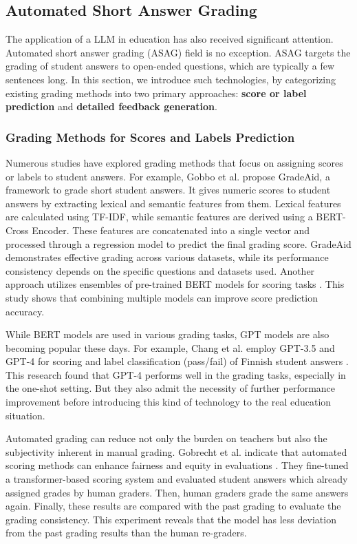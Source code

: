 \subsection{Automated Short Answer Grading}
The application of a LLM in education has also received significant attention.
Automated short answer grading (ASAG) field is no exception.
ASAG targets the grading of student answers to open-ended questions, which are typically a few sentences long.
In this section, we introduce such technologies, by categorizing existing grading methods into two primary approaches: \textbf{score or label prediction} and \textbf{detailed feedback generation}.


\subsubsection{Grading Methods for Scores and Labels Prediction}
Numerous studies have explored grading methods that focus on assigning scores or labels to student answers.
For example, Gobbo et al. propose GradeAid, a framework to grade short student answers.
It gives numeric scores to student answers by extracting lexical and semantic features \citep{gradeaid} from them.
Lexical features are calculated using TF-IDF, while semantic features are derived using a BERT-Cross Encoder.
These features are concatenated into a single vector and processed through a regression model to predict the final grading score.
GradeAid demonstrates effective grading across various datasets, while its performance consistency depends on the specific questions and datasets used.
% 
Another approach utilizes ensembles of pre-trained BERT models for scoring tasks \citep{ensembleoflm}.
This study shows that combining multiple models can improve score prediction accuracy.

While BERT models are used in various grading tasks, GPT models are also becoming popular these days.
For example, Chang et al. employ GPT-3.5 and GPT-4 for scoring and label classification (pass/fail) of Finnish student answers \citep{finnishgrading}.
This research found that GPT-4 performs well in the grading tasks, especially in the one-shot setting.
But they also admit the necessity of further performance improvement before introducing this kind of technology to the real education situation.


Automated grading can reduce not only the burden on teachers but also the subjectivity inherent in manual grading.
Gobrecht et al. indicate that automated scoring methods can enhance fairness and equity in evaluations \citep{beyondhumansubjectivity}.
They fine-tuned a transformer-based scoring system and evaluated student answers which already assigned grades by human graders.
Then, human graders grade the same answers again.
Finally, these results are compared with the past grading to evaluate the grading consistency.
This experiment reveals that the model has less deviation from the past grading results than the human re-graders.


